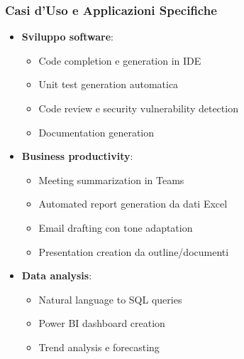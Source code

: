 \documentclass[aspectratio=169]{beamer}
\begin{document}
\begin{frame}
\frametitle{Casi d'Uso e Applicazioni Specifiche}
\begin{itemize}
    \item \textbf{Sviluppo software}:
    \begin{itemize}
        \item Code completion e generation in IDE
        \item Unit test generation automatica
        \item Code review e security vulnerability detection
        \item Documentation generation
    \end{itemize}
    \item \textbf{Business productivity}:
    \begin{itemize}
        \item Meeting summarization in Teams
        \item Automated report generation da dati Excel
        \item Email drafting con tone adaptation
        \item Presentation creation da outline/documenti
    \end{itemize}
    \item \textbf{Data analysis}:
    \begin{itemize}
        \item Natural language to SQL queries
        \item Power BI dashboard creation
        \item Trend analysis e forecasting
    \end{itemize}
\end{itemize}
\end{frame}
%
%
\end{document}
